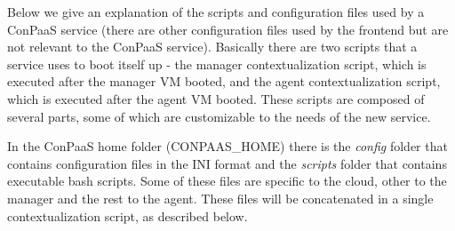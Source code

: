 \documentclass[10pt]{article}
\begin{document}
Below we give an explanation of the scripts and configuration files used by a ConPaaS service (there are other configuration files used by the frontend but are not relevant to the ConPaaS service). Basically there are two scripts that a service uses to boot itself up - the manager contextualization script, which is executed after the manager VM booted, and the agent contextualization script, which is executed after the agent VM booted. These scripts are composed of several parts, some of which are customizable to the needs of the new service.      

In the ConPaaS home folder (\textdollar CONPAAS\_HOME) there is the \textit{config} folder that contains configuration files in the INI format and the \textit{scripts} folder that contains executable bash scripts. Some of these files are specific to the cloud, other to the manager and the rest to the agent. These files will be concatenated in a single contextualization script, as described below.
\end{document}
